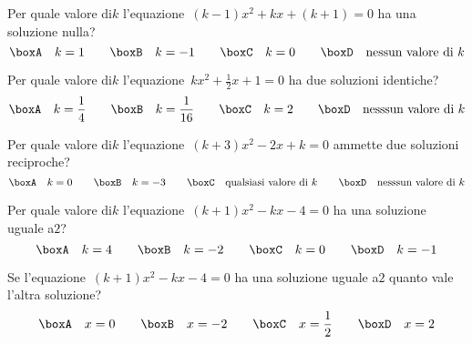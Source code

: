 \begin{esercizio}
 \label{ese:3.107}
Per quale valore di$k$ l'equazione~$(k-1) x^{2} + kx + (k + 1) = 0$ ha una 
soluzione nulla?
\[\boxA\quad k = 1\qquad\boxB\quad k = -1\qquad\boxC\quad k =0\qquad\boxD\quad 
\text{nessun valore di }k\]
\end{esercizio}

\begin{esercizio}
 \label{ese:3.108}
Per quale valore di$k$ l'equazione~$kx^{2} + \frac{1}{2} x + 1 = 0$ ha due 
soluzioni identiche?
\[\boxA\quad k = \frac{1}{4}\qquad\boxB\quad k = \frac{1}{16}\qquad\boxC\quad k 
= 2\qquad\boxD\quad \text{nesssun valore di }k\]
\end{esercizio}

\begin{esercizio}
 \label{ese:3.109}
Per quale valore di$k$ l'equazione~$(k + 3) x^{2}-2x + k = 0$ ammette due 
soluzioni reciproche?
\[\boxA\quad k = 0\qquad\boxB\quad k = -3\qquad\boxC\quad \text{qualsiasi valore 
di }k\qquad\boxD\quad \text{nesssun valore di }k\]
\end{esercizio}

\begin{esercizio}
 \label{ese:3.110}
Per quale valore di$k$ l'equazione~$(k + 1) x^{2}-kx-4 = 0$ ha una soluzione 
uguale a$2$?
\[\boxA\quad k = 4\qquad\boxB\quad k =-2\qquad\boxC\quad k = 0\qquad\boxD\quad k 
=-1\]
\end{esercizio}

\begin{esercizio}
 \label{ese:3.111}
Se l'equazione~$(k + 1) x^{2}-kx-4 = 0$ ha una soluzione uguale a$2$ quanto 
vale l'altra soluzione?
\[\boxA\quad x = 0\qquad\boxB\quad x =-2\qquad\boxC\quad x = 
\frac{1}{2}\qquad\boxD\quad x = 2\]
\end{esercizio}


